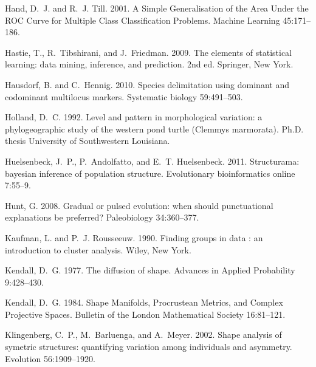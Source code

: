 \documentclass[12pt,letterpaper]{article}
\begin{document}
\begin{thebibliography}{77}
    Hand, D.~J. and R.~J. Till. 2001. {A Simple Generalisation of the Area Under
    the ROC Curve for Multiple Class Classification Problems}. Machine Learning
    45:171--186.

    Hastie, T., R.~Tibshirani, and J.~Friedman. 2009. {The elements of statistical
    learning: data mining, inference, and prediction}. 2nd ed. Springer, New
    York.

    Hausdorf, B. and C.~Hennig. 2010. {Species delimitation using dominant and
    codominant multilocus markers.} Systematic biology 59:491--503.

    Holland, D.~C. 1992. {Level and pattern in morphological variation: a
    phylogeographic study of the western pond turtle (Clemmys marmorata)}. Ph.D.
    thesis University of Southwestern Louisiana.

    Huelsenbeck, J.~P., P.~Andolfatto, and E.~T. Huelsenbeck. 2011. {Structurama:
    bayesian inference of population structure.} Evolutionary bioinformatics
    online 7:55--9.

    Hunt, G. 2008. {Gradual or pulsed evolution: when should punctuational
    explanations be preferred?} Paleobiology 34:360--377.

    Kaufman, L. and P.~J. Rousseeuw. 1990. {Finding groups in data : an
    introduction to cluster analysis}. Wiley, New York.

    Kendall, D.~G. 1977. {The diffusion of shape}. Advances in Applied Probability
    9:428--430.

    Kendall, D.~G. 1984. {Shape Manifolds, Procrustean Metrics, and Complex
    Projective Spaces}. Bulletin of the London Mathematical Society 16:81--121.

    Klingenberg, C.~P., M.~Barluenga, and A.~Meyer. 2002. {Shape analysis of
    symetric structures: quantifying variation among individuals and asymmetry}.
    Evolution 56:1909--1920.


\end{thebibliography}
\end{document}
